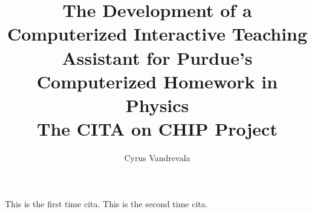 \documentclass[11pt,twoside]{book}
\title{The Development of a Computerized Interactive Teaching Assistant for Purdue's Computerized Homework in Physics\\[0.2in]The CITA on CHIP Project}
\author{Cyrus Vandrevala}
\begin{document}
\frontmatter
\maketitle



\tableofcontents
\listoffigures
\listoftables

\mainmatter




This is the first time \gls{cita}. This is the second time \gls{cita}.

\appendix




\backmatter


\printglossaries
\printindex
\end{document}
